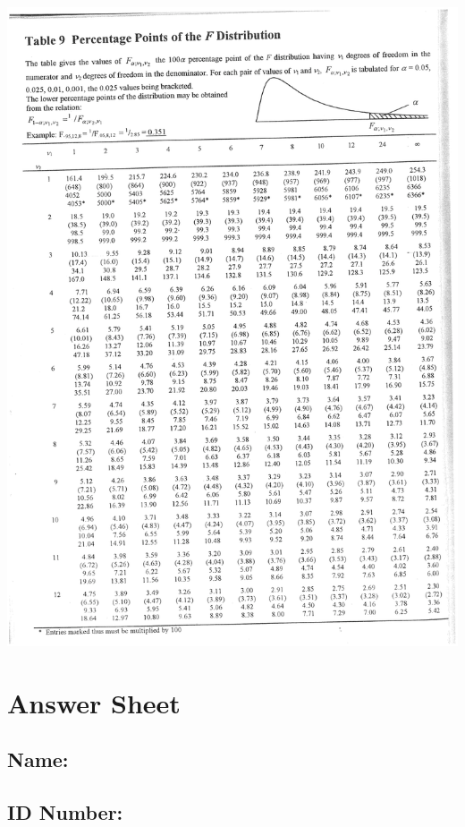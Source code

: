 \documentclass[12pt]{article}
\begin{document}
\begin{adjustwidth}{-1cm}{0cm}
\includegraphics[width=1.1\textwidth, trim = 1cm 0.7cm 1cm 1cm, clip]{mdF}
\end{adjustwidth}

\newpage
\quad
\newpage

\section*{Answer Sheet\\[0.3cm]}

\subsection*{Name:\quad\underline{\hspace{11.45cm}}\\[0.3cm]}
\subsection*{ID Number:\quad\underline{\hspace{10cm}}\\[0.5cm]}
\end{document}
